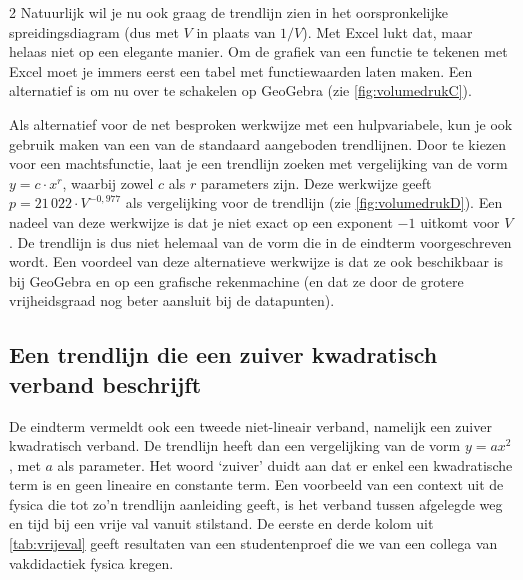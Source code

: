 \begin{multicols}{2}
Natuurlijk wil je nu ook graag de trendlijn zien in het oorspronkelijke spreidingsdiagram (dus met $V$ in plaats van $1/V$). Met Excel lukt dat, maar helaas niet op een elegante manier. Om de grafiek van een functie te tekenen met Excel moet je immers eerst een tabel met functiewaarden laten maken. Een alternatief is om nu over te schakelen op GeoGebra (zie \autoref{fig:volumedrukC}).



Als alternatief voor de net besproken werkwijze met een hulpvariabele, kun je ook gebruik maken van een van de standaard aangeboden trendlijnen. Door te kiezen voor een machtsfunctie, laat je een trendlijn zoeken met vergelijking van de vorm $y=c \cdot x^r$, waarbij zowel $c$ als $r$ parameters zijn. Deze werkwijze geeft $p=21\,022 \cdot V^{-0,977}$ als vergelijking voor de trendlijn (zie \autoref{fig:volumedrukD}). Een nadeel van deze werkwijze is dat je niet exact op een exponent $-1$ uitkomt voor $V$. De trendlijn is dus niet helemaal van de vorm die in de eindterm voorgeschreven wordt. Een voordeel van deze alternatieve werkwijze is dat ze ook beschikbaar is bij GeoGebra en op een grafische rekenmachine (en dat ze door de grotere vrijheidsgraad nog beter aansluit bij de datapunten).




    \subsection{Een trendlijn die een zuiver kwadratisch verband beschrijft}

De eindterm vermeldt ook een tweede niet-lineair verband, namelijk een zuiver kwadratisch verband. De trendlijn heeft dan een vergelijking van de vorm $y=ax^2$, met $a$ als parameter. Het woord ‘zuiver’ duidt aan dat er enkel een kwadratische term is en geen lineaire en constante term. Een voorbeeld van een context uit de fysica die tot zo’n trendlijn aanleiding geeft, is het verband tussen afgelegde weg en tijd bij een vrije val vanuit stilstand. De eerste en derde kolom uit \autoref{tab:vrijeval} geeft resultaten van een studentenproef die we van een collega van vakdidactiek fysica kregen.


\end{multicols}
